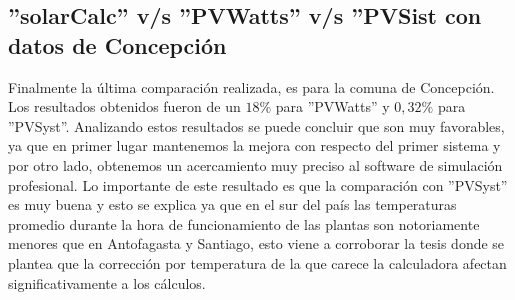 \subsection{''solarCalc'' v/s ''PVWatts'' v/s ''PVSist con datos de Concepción}
\begin{table}[h!]
\caption{Comparación de software con datos de Concepción}
\end{table}
Finalmente la última comparación realizada, es para la comuna de Concepción. Los resultados obtenidos fueron de un $18\%$ para ''PVWatts'' y $0,32\%$ para ''PVSyst''. Analizando estos resultados se puede concluir que son muy favorables, ya que en primer lugar mantenemos la mejora con respecto del primer sistema y por otro lado, obtenemos un acercamiento muy preciso al software de simulación profesional. Lo importante de este resultado es que la comparación con ''PVSyst'' es muy buena y esto se explica ya que en el sur del país las temperaturas promedio durante la hora de funcionamiento de las plantas son notoriamente menores que en Antofagasta y Santiago, esto viene a corroborar la tesis donde se plantea que la corrección por temperatura de la que carece la calculadora afectan significativamente a los cálculos.

